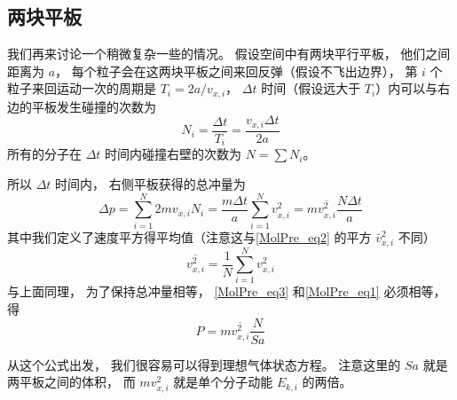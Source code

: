 \subsection{两块平板}
我们再来讨论一个稍微复杂一些的情况。 假设空间中有两块平行平板， 他们之间距离为 $a$， 每个粒子会在这两块平板之间来回反弹（假设不飞出边界）， 第 $i$ 个粒子来回运动一次的周期是 $T_i = 2a/v_{x,i}$， $\Delta t$ 时间（假设远大于 $T_i$）内可以与右边的平板发生碰撞的次数为
\begin{equation}
N_i = \frac{\Delta t}{T_i} = \frac{v_{x,i} \Delta t}{2a}
\end{equation}
所有的分子在 $\Delta t$ 时间内碰撞右壁的次数为 $N = \sum N_i$。

所以 $\Delta t$ 时间内， 右侧平板获得的总冲量为
\begin{equation}\label{MolPre_eq3}
\Delta p = \sum_{i=1}^N 2mv_{x,i} N_i = \frac{m \Delta t}{a} \sum_{i=1}^N v_{x,i}^2 = m\overline {v_{x,i}^2} \frac{ N\Delta t}{a}
\end{equation}
其中我们定义了速度平方得平均值（注意这与\autoref{MolPre_eq2} 的平方 $\bar v_{x,i}^2$ 不同）
\begin{equation}
\overline {v_{x,i}^2} = \frac{1}{N} \sum_{i=1}^N v_{x,i}^2
\end{equation}
与上面同理， 为了保持总冲量相等， \autoref{MolPre_eq3} 和\autoref{MolPre_eq1} 必须相等， 得
\begin{equation}\label{MolPre_eq4}
P = m \overline {v_{x,i}^2} \frac{N}{Sa}
\end{equation}

从这个公式出发， 我们很容易可以得到理想气体状态方程。 注意这里的 $Sa$ 就是两平板之间的体积， 而 $mv_{x,i}^2$ 就是单个分子动能 $E_{k,i}$ 的两倍。

